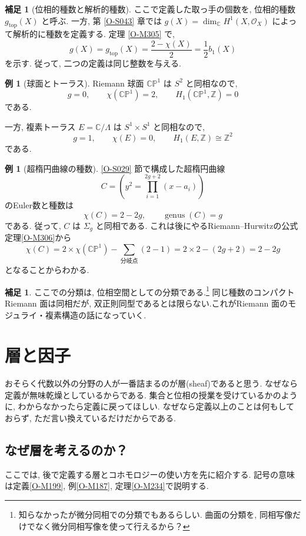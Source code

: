 \documentclass[dvipdfmx,a4paper,11pt]{article} %
\newcommand{\Z}{\mathbb{Z}}
\newcommand{\C}{\mathbb{C}}
\theoremstyle{definition}
\numberwithin{equation}{section}
\newtheorem{rem}[thm]{補足}
\newtheorem{exa}[thm]{例}
\begin{document}
\begin{rem}[位相的種数と解析的種数]
ここで定義した取っ手の個数を, 位相的種数 $g_{\mathrm{top}}(X)$ と呼ぶ.
一方, 第 \ref{O-S043} 章では
$g(X)=\dim_\C H^1(X,\mathcal O_X)$ によって解析的に種数を定義する.
定理 \ref{O-M305} で,
\[
g(X)=g_{\mathrm{top}}(X)
=\frac{2-\chi(X)}2=\frac12 b_1(X)
\]
を示す. 従って, 二つの定義は同じ整数を与える.
\end{rem}

\begin{exa}[球面とトーラス]
Riemann 球面 $\C\mathbb P^1$ は $S^2$ と同相なので, 
\[
g=0,\qquad \chi(\C\mathbb P^1)=2,\qquad
H_1(\C\mathbb P^1,\Z)=0
\]
である.

一方, 複素トーラス $E=\C/\Lambda$ は
$S^1\times S^1$ と同相なので, 
\[
g=1,\qquad \chi(E)=0,\qquad
H_1(E,\Z)\cong\Z^2
\]
である.
\end{exa}

\begin{exa}[超楕円曲線の種数]\label{O-M175}
\ref{O-S029} 節で構成した超楕円曲線
\[
C=\left(y^2=\prod_{i=1}^{2g+2}(x-a_i)\right)
\]
のEuler数と種数は
\[
\chi(C)=2-2g,\qquad \operatorname{genus}(C)=g
\]
である.
従って, $C$ は $\Sigma_g$ と同相である.
これは後にやるRiemann--Hurwitzの公式定理\ref{O-M306}から
$$
\chi(C)
= 
2 \times \chi(\C\mathbb P^1) - \sum_{\text{分岐点}} (2-1)
=2 \times 2 - (2g+2) = 2-2g
$$
となることからわかる. 
\end{exa}

\begin{rem}
ここでの分類は, 位相空間としての分類である.\footnote{知らなかったが微分同相での分類でもあるらしい. 曲面の分類を, 同相写像だけでなく微分同相写像を使って行えるから？}
同じ種数のコンパクトRiemann 面は同相だが, 
双正則同型であるとは限らない.これがRiemann 面のモジュライ・複素構造の話になっていく. 
\end{rem}



\newpage
\section{層と因子}\label{O-S032}

おそらく代数以外の分野の人が一番詰まるのが層(sheaf)であると思う.
なぜなら定義が無味乾燥としているからである. 集合と位相の授業を受けているかのように, わからなかったら定義に戻ってほしい. なぜなら定義以上のことは何もしておらず, ただ言い換えているだけだからである. 

\subsection{なぜ層を考えるのか？}
ここでは, 後で定義する層とコホモロジーの使い方を先に紹介する. 記号の意味は定義\ref{O-M199}, 例\ref{O-M187}, 定理\ref{O-M234}で説明する.
\end{document}
